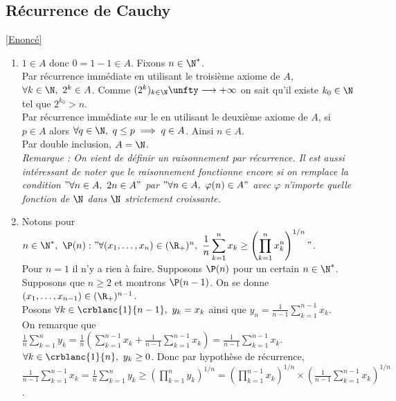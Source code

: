 \documentclass{book}
\begin{document}
	\subsection{Récurrence de Cauchy}
	\label{sec:recurrence-de-cauchy}
	\textcolor{blue}{\hyperref[Récurrence de Cauchy]{[Enoncé]}}\\
	\begin{enumerate}[leftmargin=*]
		\item $1\in A$ donc $0=1-1\in A$. Fixons $n\in \N^*$.\\
		Par récurrence immédiate en utilisant le troisième axiome de $A$, $\forall k\in \N,\ 2^k\in A$. Comme $(2^k)_{k\in \N}\unfty\longrightarrow+\infty$ on sait qu'il existe $k_0\in \N$ tel que $2^{k_0}>n$.\\
		Par récurrence immédiate sur le en utilisant le deuxième axiome de $A$, si $p\in A$ alors $\forall q\in \N,\ q\leq p\implies q\in A$. Ainsi $n\in A$.\\
		Par double inclusion, $A=\N$.\\
		\textit{Remarque : On vient de définir un raisonnement par récurrence. Il est aussi intéressant de noter que le raisonnement fonctionne encore si on remplace la condition $"\forall n\in A,\ 2n\in A"$ par $"\forall n\in A,\ \varphi(n)\in A"$ avec $\varphi$ n'importe quelle fonction de $\N$ dans $\N$ strictement croissante.}
		\item Notons pour $n\in \N^*,\ \P(n):"\forall (x_1,\dots,x_n)\in (\R_+)^n,\ \displaystyle\frac{1}{n}\sum_{k=1}^nx_k\geq \left(\prod_{k=1}^nx_k^n\right)^{1/n}"$.\\
		Pour $n=1$ il n'y a rien à faire. Supposons $\P(n)$ pour un certain $n\in \N^*$.\\
		Supposons que $n\geq 2$ et montrons $\P(n-1)$. On se donne $(x_1,\dots,x_{n-1})\in (\R_+)^{n-1}$.\\
		Posons $\forall k\in \crblanc{1}{n-1},\ y_k=x_k$ ainsi que $y_n=\displaystyle\frac{1}{n-1}\sum_{k=1}^{n-1}x_k$.\\
		On remarque que $\displaystyle\frac{1}{n}\sum_{k=1}^ny_k=\frac{1}{n}\left(\sum_{k=1}^{n-1}x_k+\frac{1}{n-1}\sum_{k=1}^{n-1}x_k\right)=\frac{1}{n-1}\sum_{k=1}^{n-1}x_k$.\\
		$\forall k\in \crblanc{1}{n},\ y_k\geq 0$. Donc par hypothèse de récurrence,\\
		$\displaystyle\frac{1}{n-1}\sum_{k=1}^{n-1}x_k=\frac{1}{n}\sum_{k=1}^ny_k\geq \left(\prod_{k=1}^ny_k\right)^{1/n}=\left(\prod_{k=1}^{n-1}x_k\right)^{1/n}\times\left(\frac{1}{n-1}\sum_{k=1}^{n-1}x_k\right)^{1/n}$.\\

\end{enumerate}
\end{document}
